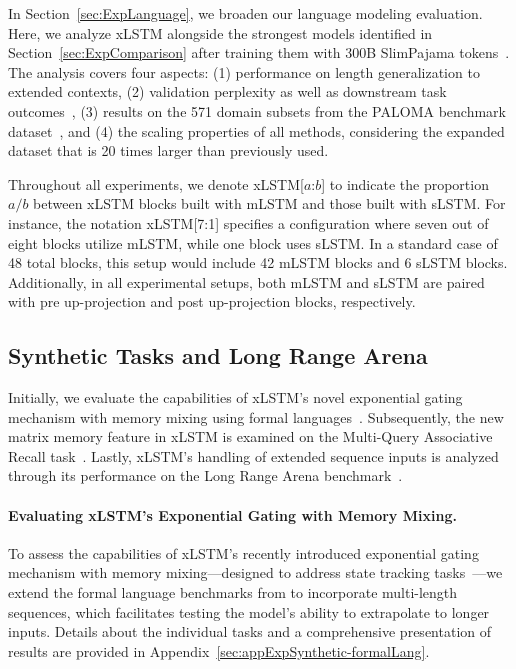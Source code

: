 In Section~\ref{sec:ExpLanguage}, we broaden our language modeling evaluation. Here, we analyze xLSTM alongside the strongest models identified in Section~\ref{sec:ExpComparison} after training them with 300B SlimPajama tokens~\citep{Soboleva:23}. The analysis covers four aspects: (1) performance on length generalization to extended contexts, (2) validation perplexity as well as downstream task outcomes~\citep{Sutawika:24}, (3) results on the 571 domain subsets from the PALOMA benchmark dataset~\citep{Magnusson:23arxivshort}, and (4) the scaling properties of all methods, considering the expanded dataset that is 20 times larger than previously used.

\label{sec:xlstm_blocks_notation}
Throughout all experiments, we denote xLSTM[$a$:$b$] to indicate the proportion $a/b$ between xLSTM blocks built with mLSTM and those built with sLSTM. For instance, the notation xLSTM[7:1] specifies a configuration where seven out of eight blocks utilize mLSTM, while one block uses sLSTM. In a standard case of 48 total blocks, this setup would include 42 mLSTM blocks and 6 sLSTM blocks. Additionally, in all experimental setups, both mLSTM and sLSTM are paired with pre up-projection and post up-projection blocks, respectively.

\subsection{Synthetic Tasks and Long Range Arena}
\label{sec:ExpSyntethic}
Initially, we evaluate the capabilities of xLSTM’s novel exponential gating mechanism with memory mixing using formal languages~\citep{Deletang:23}. Subsequently, the new matrix memory feature in xLSTM is examined on the Multi-Query Associative Recall task~\citep{Arora:23arxiv}. Lastly, xLSTM’s handling of extended sequence inputs is analyzed through its performance on the Long Range Arena benchmark~\citep{Tay:21}.

\paragraph{Evaluating xLSTM's Exponential Gating with Memory Mixing.} To assess the capabilities of xLSTM's recently introduced exponential gating mechanism with memory mixing—designed to address state tracking tasks~\citep{Merrill:24, Merrill:23}—we extend the formal language benchmarks from \citet{Deletang:23} to incorporate multi-length sequences, which facilitates testing the model's ability to extrapolate to longer inputs. Details about the individual tasks and a comprehensive presentation of results are provided in Appendix~\ref{sec:appExpSynthetic-formalLang}. 

